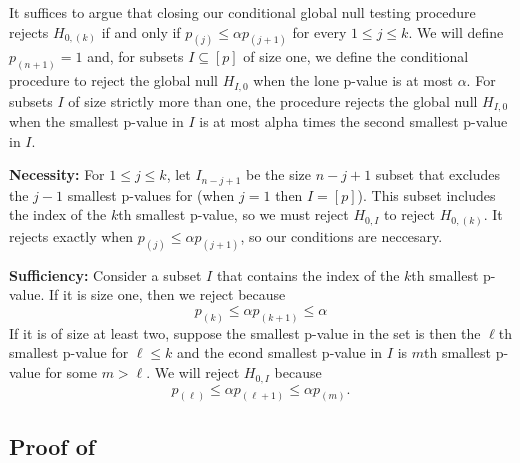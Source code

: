 \documentclass{article}
\begin{document}
\begin{appendix}
It suffices to argue that closing our conditional global null testing procedure rejects $H_{0, (k)}$ if and only if $p_{(j)} \leq \alpha p_{(j + 1)} $ for every $1 \leq j \leq k$. We will define $p_{(n+1)} = 1$ and, for subsets $I \subseteq [p]$ of size one, we define the conditional procedure to reject the global null $H_{I, 0}$ when the lone p-value is at most $\alpha$. For subsets $I$ of size strictly more than one, the procedure rejects the global null $H_{I, 0}$ when the smallest p-value in $I$ is at most alpha times the second smallest p-value in $I$. \newline 

\noindent \textbf{Necessity: } For $1 \leq j \leq k$, let $I_{n-j + 1}$ be the size $n - j + 1$ subset that excludes the $j - 1$ smallest p-values for (when $j = 1$ then $I = [p]$). This subset includes the index of the $k$th smallest p-value, so we must reject $H_{0, I}$ to reject $H_{0, (k)}$. It rejects exactly when $p_{(j)} \leq \alpha p_{(j + 1)}$, so our conditions are neccesary. \newline 

\noindent \textbf{Sufficiency: } Consider a subset $I$ that contains the index of the $k$th smallest p-value. If it is size one, then we reject because
\begin{equation*}
    p_{(k)} \leq \alpha p_{(k+1)} \leq \alpha 
\end{equation*}
If it is of size at least two, suppose the smallest p-value in the set is then the $\ell$th smallest p-value for $\ell \leq k$ and the econd smallest p-value in $I$ is $m$th smallest p-value for some $m > \ell$. We will reject $H_{0, I}$ because 
\begin{equation*}
    p_{(\ell)} \leq \alpha p_{(\ell + 1)} \leq \alpha p_{(m)}.
\end{equation*}

\subsection{Proof of }
\label{sec:hyb_proof_appdx}


\end{appendix}
\end{document}
